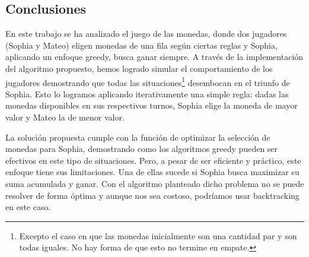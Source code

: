 \subsection{Conclusiones}

En este trabajo se ha analizado el juego de las monedas, donde dos jugadores (Sophia y Mateo) eligen monedas de una fila
según ciertas reglas y Sophia, aplicando un enfoque greedy, busca ganar siempre. A través de la implementación del algoritmo 
propuesto, hemos logrado simular el comportamiento de los jugadores demostrando que todas las situaciones\footnote{ Excepto el
caso en que las monedas inicialmente son una cantidad par y son todas iguales. No hay forma de que esto no termine en empate.} 
desembocan  en el triunfo de Sophia. Esto lo logramos aplicando iterativamente una simple regla: dadas las monedas disponibles
en sus respectivos turnos, Sophia elige la moneda de mayor valor y Mateo la de menor valor.

La solución propuesta cumple con la función de optimizar la selección de monedas para Sophia, demostrando como los algoritmos greedy
pueden ser efectivos en este tipo de situaciones. Pero, a pesar de ser eficiente y práctico, este enfoque tiene sus limitaciones. Una
de ellas sucede si Sophia busca maximizar su suma acumulada y ganar. Con el algoritmo planteado dicho problema no se puede resolver
de forma óptima y aunque nos sea costoso, podríamos usar backtracking en este caso.